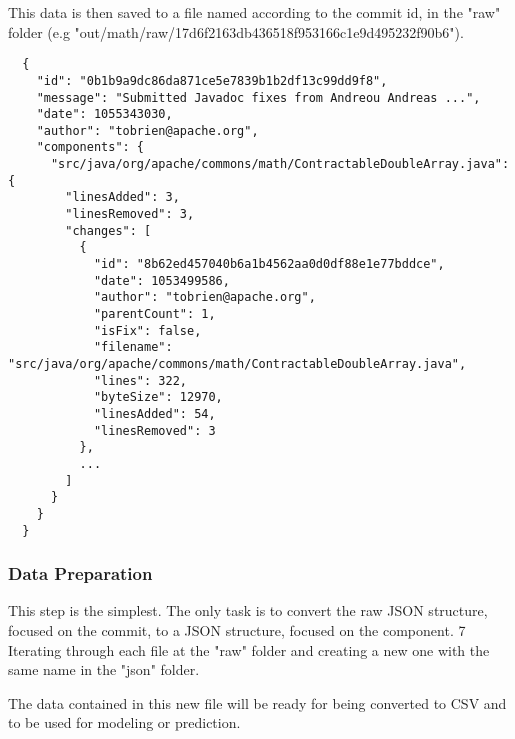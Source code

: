 

This data is then saved to a file named according to the commit id, in the "raw" folder (e.g "out/math/raw/17d6f2163db436518f953166c1e9d495232f90b6").

\begin{lstlisting}
  {
    "id": "0b1b9a9dc86da871ce5e7839b1b2df13c99dd9f8",
    "message": "Submitted Javadoc fixes from Andreou Andreas ...",
    "date": 1055343030,
    "author": "tobrien@apache.org",
    "components": {
      "src/java/org/apache/commons/math/ContractableDoubleArray.java": {
        "linesAdded": 3,
        "linesRemoved": 3,
        "changes": [
          {
            "id": "8b62ed457040b6a1b4562aa0d0df88e1e77bddce",
            "date": 1053499586,
            "author": "tobrien@apache.org",
            "parentCount": 1,
            "isFix": false,
            "filename": "src/java/org/apache/commons/math/ContractableDoubleArray.java",
            "lines": 322,
            "byteSize": 12970,
            "linesAdded": 54,
            "linesRemoved": 3
          },
          ...
        ]
      }
    }
  }
\end{lstlisting}



\subsubsection{Data Preparation}

This step is the simplest. The only task is to convert the raw JSON structure, focused on the commit, to a JSON structure, focused on the component. 7
Iterating through each file at the "raw" folder and creating a new one with the same name in the "json" folder.

The data contained in this new file will be ready for being converted to CSV and to be used for modeling or prediction.

